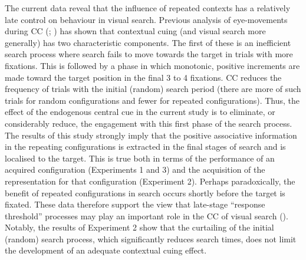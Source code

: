 \documentclass[
  man,
  floatsintext,
  longtable,
  nolmodern,
  notxfonts,
  notimes,
  colorlinks=true,linkcolor=blue,citecolor=blue,urlcolor=blue]{apa7}
\begin{document}
The current data reveal that the influence of repeated contexts has a
relatively late control on behaviour in visual search. Previous analysis
of eye-movements during CC (; ) has shown that
contextual cuing (and visual search more generally) has two
characteristic components. The first of these is an inefficient search
process where search fails to move towards the target in trials with
more fixations. This is followed by a phase in which monotonic, positive
increments are made toward the target position in the final 3 to 4
fixations. CC reduces the frequency of trials with the initial (random)
search period (there are more of such trials for random configurations
and fewer for repeated configurations). Thus, the effect of the
endogenous central cue in the current study is to eliminate, or
considerably reduce, the engagement with this first phase of the search
process. The results of this study strongly imply that the positive
associative information in the repeating configurations is extracted in
the final stages of search and is localised to the target. This is true
both in terms of the performance of an acquired configuration
(Experiments 1 and 3) and the acquisition of the representation for that
configuration (Experiment 2). Perhaps paradoxically, the benefit of
repeated configurations in search occurs shortly before the target is
fixated. These data therefore support the view that late-stage
``response threshold'' processes may play an important role in the CC of
visual search (). Notably,
the results of Experiment 2 show that the curtailing of the initial
(random) search process, which significantly reduces search times, does
not limit the development of an adequate contextual cuing effect.

\newpage

\newpage
\end{document}
